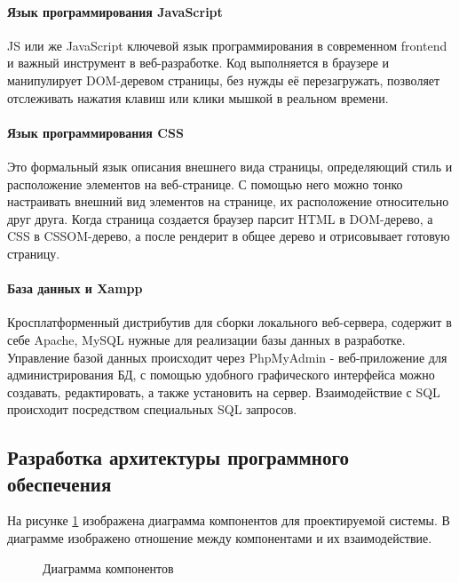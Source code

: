 \paragraph{Язык программирования JavaScript}

JS или же JavaScript ключевой язык программирования в современном frontend и важный инструмент в веб-разработке. Код выполняется в браузере и манипулирует DOM-деревом страницы, без нужды её перезагружать, позволяет отслеживать нажатия клавиш или клики мышкой в реальном времени.

\paragraph{Язык программирования CSS}

Это формальный язык описания внешнего вида страницы, определяющий стиль и расположение элементов на веб-странице. С помощью него можно тонко настраивать внешний вид элементов на странице, их расположение относительно друг друга. Когда страница создается браузер парсит HTML в DOM-дерево, а CSS в CSSOM-дерево, а после рендерит в общее дерево и отрисовывает готовую страницу.

\paragraph{База данных и Xampp}

Кросплатформенный  дистрибутив для сборки локального веб-сервера, содержит в себе Apache, MySQL нужные для реализации базы данных в разработке. Управление базой данных происходит через PhpMyAdmin - веб-приложение для администрирования БД, с помощью удобного графического интерфейса можно создавать, редактировать, а также установить на сервер. Взаимодействие с SQL происходит посредством специальных SQL запросов.

\subsection{Разработка архитектуры программного обеспечения}

На рисунке \ref{thatsmedio1:image} изображена диаграмма компонентов для проектируемой системы. В диаграмме изображено отношение между компонентами и их взаимодействие.

\begin{figure}[ht]
\caption{Диаграмма компонентов}
\label{thatsmedio1:image}
\end{figure}

